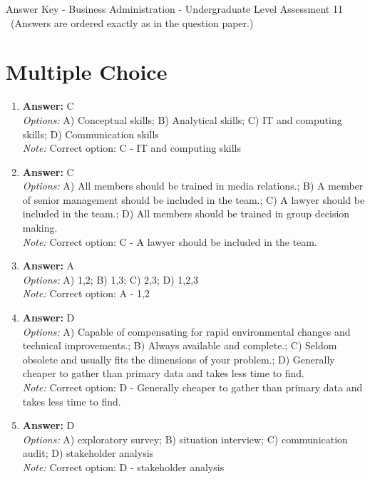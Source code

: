 \documentclass[12pt]{article}
\begin{document}
\begin{center}
Answer Key - Business Administration - Undergraduate Level Assessment 11 \
\small (Answers are ordered exactly as in the question paper.)
\end{center}

\section*{Multiple Choice}
\begin{enumerate}[label=\arabic*.]
\item \textbf{Answer:} C
\\ \textit{Options:} A) Conceptual skills; B) Analytical skills; C) IT and computing skills; D) Communication skills
\\ \textit{Note:} Correct option: C - IT and computing skills
\item \textbf{Answer:} C
\\ \textit{Options:} A) All members should be trained in media relations.; B) A member of senior management should be included in the team.; C) A lawyer should be included in the team.; D) All members should be trained in group decision making.
\\ \textit{Note:} Correct option: C - A lawyer should be included in the team.
\item \textbf{Answer:} A
\\ \textit{Options:} A) 1,2; B) 1,3; C) 2,3; D) 1,2,3
\\ \textit{Note:} Correct option: A - 1,2
\item \textbf{Answer:} D
\\ \textit{Options:} A) Capable of compensating for rapid environmental changes and technical improvements.; B) Always available and complete.; C) Seldom obsolete and usually fits the dimensions of your problem.; D) Generally cheaper to gather than primary data and takes less time to find.
\\ \textit{Note:} Correct option: D - Generally cheaper to gather than primary data and takes less time to find.
\item \textbf{Answer:} D
\\ \textit{Options:} A) exploratory survey; B) situation interview; C) communication audit; D) stakeholder analysis
\\ \textit{Note:} Correct option: D - stakeholder analysis
\end{enumerate}
\end{document}
